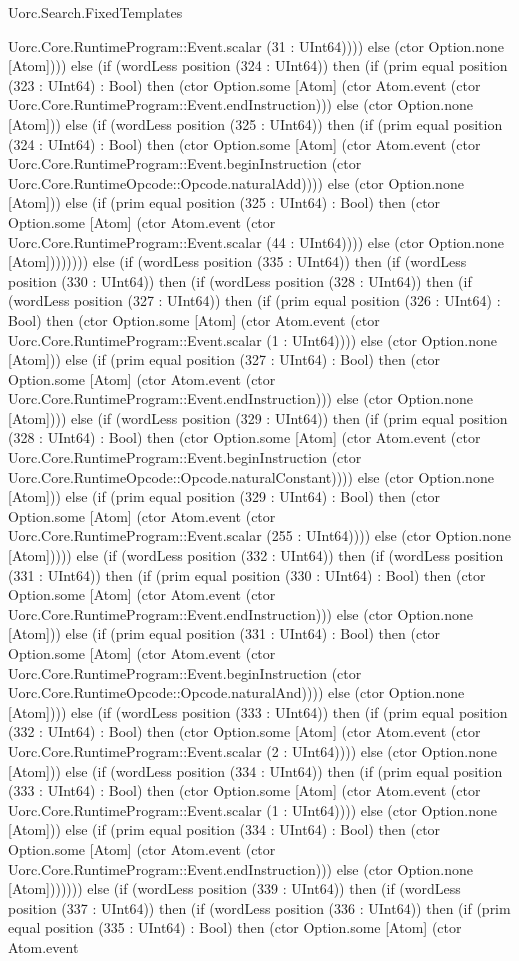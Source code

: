 \begin{lexlean}{Uorc.Search.FixedTemplates}
\begin{semanticmodule}
{Uorc.Core.RuntimeProgram::Event.scalar (31 : UInt64)))) else (ctor Option.none [Atom]))) else (if (wordLess position (324 : UInt64)) then (if (prim equal position (323 : UInt64) : Bool) then (ctor Option.some [Atom] (ctor Atom.event (ctor Uorc.Core.RuntimeProgram::Event.endInstruction))) else (ctor Option.none [Atom])) else (if (wordLess position (325 : UInt64)) then (if (prim equal position (324 : UInt64) : Bool) then (ctor Option.some [Atom] (ctor Atom.event (ctor Uorc.Core.RuntimeProgram::Event.beginInstruction (ctor Uorc.Core.RuntimeOpcode::Opcode.naturalAdd)))) else (ctor Option.none [Atom])) else (if (prim equal position (325 : UInt64) : Bool) then (ctor Option.some [Atom] (ctor Atom.event (ctor Uorc.Core.RuntimeProgram::Event.scalar (44 : UInt64)))) else (ctor Option.none [Atom]))))))) else (if (wordLess position (335 : UInt64)) then (if (wordLess position (330 : UInt64)) then (if (wordLess position (328 : UInt64)) then (if (wordLess position (327 : UInt64)) then (if (prim equal position (326 : UInt64) : Bool) then (ctor Option.some [Atom] (ctor Atom.event (ctor Uorc.Core.RuntimeProgram::Event.scalar (1 : UInt64)))) else (ctor Option.none [Atom])) else (if (prim equal position (327 : UInt64) : Bool) then (ctor Option.some [Atom] (ctor Atom.event (ctor Uorc.Core.RuntimeProgram::Event.endInstruction))) else (ctor Option.none [Atom]))) else (if (wordLess position (329 : UInt64)) then (if (prim equal position (328 : UInt64) : Bool) then (ctor Option.some [Atom] (ctor Atom.event (ctor Uorc.Core.RuntimeProgram::Event.beginInstruction (ctor Uorc.Core.RuntimeOpcode::Opcode.naturalConstant)))) else (ctor Option.none [Atom])) else (if (prim equal position (329 : UInt64) : Bool) then (ctor Option.some [Atom] (ctor Atom.event (ctor Uorc.Core.RuntimeProgram::Event.scalar (255 : UInt64)))) else (ctor Option.none [Atom])))) else (if (wordLess position (332 : UInt64)) then (if (wordLess position (331 : UInt64)) then (if (prim equal position (330 : UInt64) : Bool) then (ctor Option.some [Atom] (ctor Atom.event (ctor Uorc.Core.RuntimeProgram::Event.endInstruction))) else (ctor Option.none [Atom])) else (if (prim equal position (331 : UInt64) : Bool) then (ctor Option.some [Atom] (ctor Atom.event (ctor Uorc.Core.RuntimeProgram::Event.beginInstruction (ctor Uorc.Core.RuntimeOpcode::Opcode.naturalAnd)))) else (ctor Option.none [Atom]))) else (if (wordLess position (333 : UInt64)) then (if (prim equal position (332 : UInt64) : Bool) then (ctor Option.some [Atom] (ctor Atom.event (ctor Uorc.Core.RuntimeProgram::Event.scalar (2 : UInt64)))) else (ctor Option.none [Atom])) else (if (wordLess position (334 : UInt64)) then (if (prim equal position (333 : UInt64) : Bool) then (ctor Option.some [Atom] (ctor Atom.event (ctor Uorc.Core.RuntimeProgram::Event.scalar (1 : UInt64)))) else (ctor Option.none [Atom])) else (if (prim equal position (334 : UInt64) : Bool) then (ctor Option.some [Atom] (ctor Atom.event (ctor Uorc.Core.RuntimeProgram::Event.endInstruction))) else (ctor Option.none [Atom])))))) else (if (wordLess position (339 : UInt64)) then (if (wordLess position (337 : UInt64)) then (if (wordLess position (336 : UInt64)) then (if (prim equal position (335 : UInt64) : Bool) then (ctor Option.some [Atom] (ctor Atom.event }
\end{semanticmodule}
\end{lexlean}
